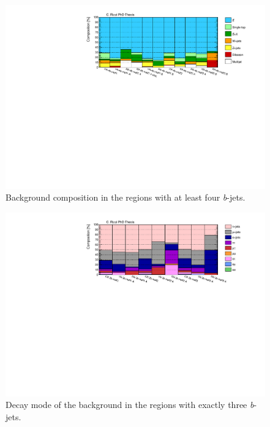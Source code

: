 \begin{figure}[htbp]
\includegraphics[width=\textwidth]{figures/ewk_prod/comp_plots/hh_4b_bkg.pdf}
\caption{Background composition in the regions with at least four \textit{b}-jets.}
	\label{fig:bkgcomp_hh4b}
\end{figure}

\begin{figure}[htbp]
\includegraphics[width=\textwidth]{figures/ewk_prod/comp_plots/hh_3b_tt.pdf}
\caption{Decay mode of the \ttbar background in the regions with exactly three \textit{b}-jets.}
	\label{fig:ttcomp_hh3b}
\end{figure}

